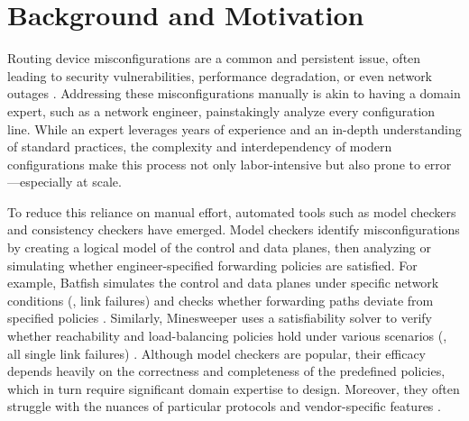 \section{Background and Motivation}
\label{sec_background}


Routing device misconfigurations are a common and persistent issue, often leading to
security vulnerabilities, performance degradation, or even network outages
\cite{zheng2012atpg, feamster2005detecting}. Addressing these misconfigurations
manually is akin to having a domain expert, such as a network engineer,
painstakingly analyze every configuration line. While an expert leverages years
of experience and an in-depth understanding of standard practices, the complexity
and interdependency of modern configurations \cite{le2007rr, benson2009complexitymetrics}
make this process not only labor-intensive but also prone to error—especially at scale.

To reduce this reliance on manual effort, automated tools such as model checkers
and consistency checkers have emerged. Model checkers
\cite{fogel2015general, beckett2017general, abhashkumar2020tiramisu, prabhu2020plankton,
	zhang2022sre, steffen2020netdice, ye2020hoyan, ritchey2000using, al2011configchecker,
	jeffrey2009model} identify misconfigurations by creating a logical model of the
control and data planes, then analyzing or simulating whether engineer-specified
forwarding policies are satisfied. For example, Batfish simulates the control and data
planes under specific network conditions (\eg, link failures) and checks whether
forwarding paths deviate from specified policies \cite{fogel2015general}.
Similarly, Minesweeper uses a satisfiability solver to verify whether reachability
and load-balancing policies hold under various scenarios (\eg, all single link
failures) \cite{beckett2017general}. Although model checkers are popular, their
efficacy depends heavily on the correctness and completeness of the predefined
policies, which in turn require significant domain expertise to design. Moreover,
they often struggle with the nuances of particular protocols and vendor-specific
features \cite{ye2020hoyan, birkner2021metha}.

